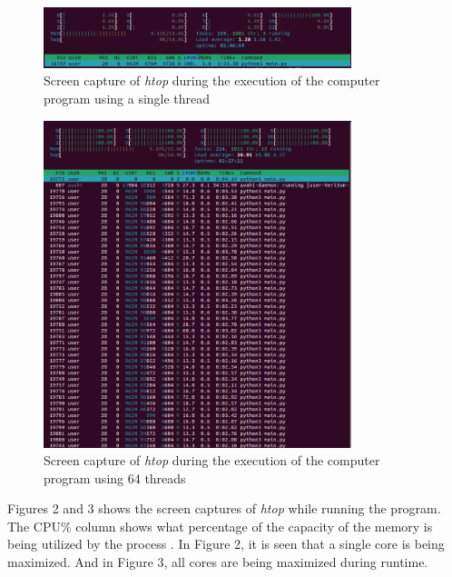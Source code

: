 \documentclass{article}
\begin{document}
\begin{figure}[H]
    \includegraphics[width=0.8\textwidth]{table01.png}
    \centering
    \caption{Screen capture of \emph{htop} during the execution of the computer program using a single thread}
    \end{figure}

\begin{figure}[H]
    \includegraphics[width=0.8\textwidth]{table07.png}
    \centering
    \caption{Screen capture of \emph{htop} during the execution of the computer program using 64 threads}
    \end{figure}

\indent Figures 2 and 3 shows the screen captures of \emph{htop} while running the program. The CPU\% column shows what percentage of the capacity of the memory is being utilized by the process \cite{htop}. In Figure 2, it is seen that a single core is being maximized. And in Figure 3, all cores are being maximized during runtime.
\end{document}
